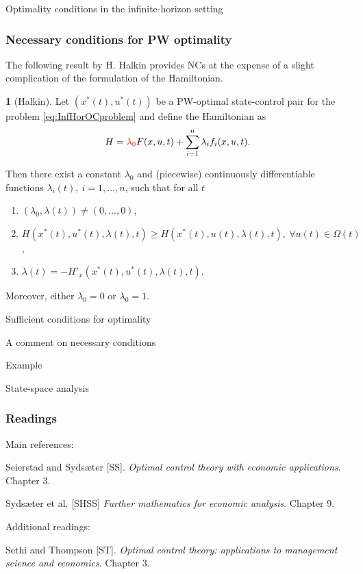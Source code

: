 \documentclass[10pt]{beamer}
\theoremstyle{definition}
\newtheorem{Fact}{\translate{Fact}}
\begin{document}
\begin{section}{Optimality conditions in the infinite-horizon setting}\label{sec:NCsSCs}

\begin{frame}[fragile]
\frametitle{Necessary conditions for PW optimality}
The following result by H. Halkin provides NCs at the expense of a slight complication of the formulation of the Hamiltonian.

\begin{Fact}[Halkin]
Let $ (x^*(t),u^*(t) ) $ be a PW-optimal state-control pair for the problem \eqref{eq:InfHorOCproblem} and define the Hamiltonian as \[ H = \textcolor{red}{\lambda_0} F(x,u,t) + \sum_{i=1}^{n}\lambda_i f_i(x,u,t). \]

Then there exist a constant $ \lambda_0 $ and (piecewise) continuously differentiable functions $ \lambda_i(t),~i=1,\ldots,n $, such that for all $ t $
\begin{enumerate}
\item $ (\lambda_0,\lambda(t)) \neq (0,\ldots,0)$,
\item $ H(x^*(t),u^*(t),\lambda(t),t )\geq H(x^*(t),u(t),\lambda(t),t ),~\forall u(t)\in \Omega(t) $,
\item $ \dot{\lambda}(t) = -H'_x(x^*(t),u^*(t),\lambda(t),t) $.
\end{enumerate}

Moreover, either $ \lambda_0=0 $ or $ \lambda_0=1 $.
\label{fc:HalkinNCs}
\end{Fact}
\end{frame}









Sufficient conditions for optimality

A comment on necessary conditions

Example

State-space analysis

\end{section}

\begin{frame}[fragile]
\frametitle{Readings}
Main references:\bigskip

Seierstad and Syds\ae{}ter [SS]. \emph{Optimal control theory with economic applications}. Chapter 3.

Syds\ae{}ter et al. [SHSS] \emph{Further mathematics for economic analysis}. Chapter 9.\bigskip

Additional readings:

Sethi and Thompson [ST]. \emph{Optimal control theory: applications to management science and economics}. Chapter 3.
\end{frame}
\end{document}
